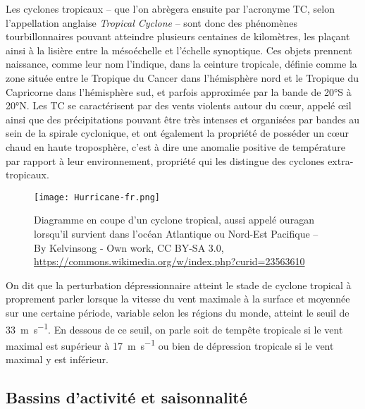\documentclass[../main.tex]{subfiles}
\begin{document}
Les cyclones tropicaux -- que l'on abrègera ensuite par l'acronyme TC, selon l'appellation anglaise \textit{Tropical Cyclone} -- sont donc des phénomènes tourbillonnaires pouvant atteindre plusieurs centaines de kilomètres, les plaçant ainsi à la lisière entre la mésoéchelle et l'échelle synoptique. Ces objets prennent naissance, comme leur nom l'indique, dans la ceinture tropicale, définie comme la zone située entre le Tropique du Cancer dans l'hémisphère nord et le Tropique du Capricorne dans
l'hémisphère sud, et parfois approximée par la bande de \ang{20}S à \ang{20}N. Les TC se caractérisent par des vents violents autour du cœur, appelé œil ainsi que des précipitations pouvant être très intenses et organisées par bandes au sein de la spirale cyclonique, et ont également la propriété de posséder un cœur chaud en haute troposphère, c'est à dire une anomalie positive de température par rapport à leur environnement, propriété qui les distingue des cyclones extra-tropicaux.

\begin{figure}[t]
    \centering
    \texttt{[image: Hurricane-fr.png]}
    \caption{Diagramme en coupe d'un cyclone tropical, aussi appelé ouragan lorsqu'il survient dans l'océan Atlantique ou Nord-Est Pacifique -- By Kelvinsong - Own work, CC BY-SA 3.0, \url{https://commons.wikimedia.org/w/index.php?curid=23563610}}
    \label{fig:diagramme_TC}
\end{figure}

On dit que la perturbation dépressionnaire atteint le stade de cyclone tropical à proprement parler lorsque la vitesse du vent maximale à la surface et moyennée sur une certaine période, variable selon les régions du monde, atteint le seuil de \SI{33}{\metre\per\second}. En dessous de ce seuil, on parle soit de tempête tropicale si le vent maximal est supérieur à \SI{17}{\metre\per\second} ou bien de dépression tropicale si le vent maximal y est inférieur.

\subsection{Bassins d'activité et saisonnalité}\label{sec:bassins_saisons}
\end{document}
